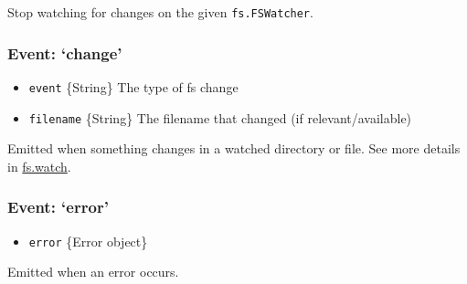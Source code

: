 Stop watching for changes on the given \texttt{fs.FSWatcher}.

\subsubsection{\texorpdfstring{Event:
`change'}{Event: change}}\label{event-change}

\begin{itemize}
\itemsep1pt\parskip0pt
\item
  \texttt{event} \{String\} The type of fs change
\item
  \texttt{filename} \{String\} The filename that changed (if
  relevant/available)
\end{itemize}

Emitted when something changes in a watched directory or file. See more
details in
\hyperref[fsux5ffsux5fwatchux5ffilenameux5foptionsux5flistener]{fs.watch}.

\subsubsection{\texorpdfstring{Event:
`error'}{Event: error}}\label{event-error}

\begin{itemize}
\itemsep1pt\parskip0pt
\item
  \texttt{error} \{Error object\}
\end{itemize}

Emitted when an error occurs.
